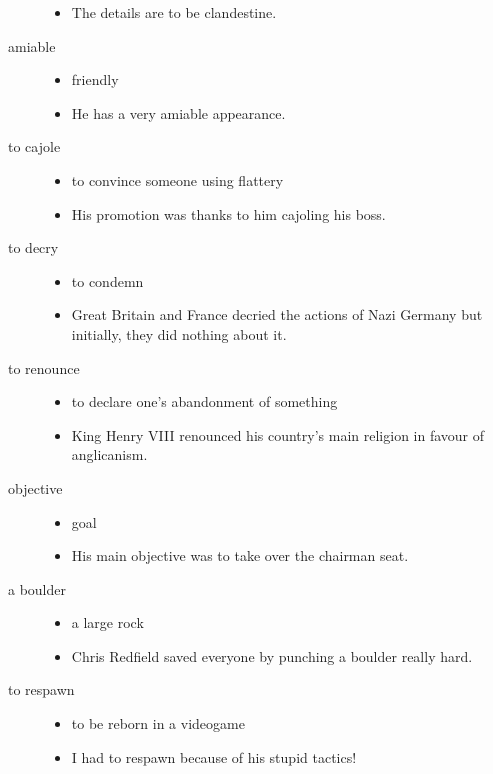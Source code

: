 \documentclass[a4paper]{article}
\begin{document}
\begin{description}
\begin{itemize}
        \item The details are to be clandestine.
    \end{itemize}
    \item[amiable] \begin{itemize}
        \item friendly
        \item He has a very amiable appearance.
    \end{itemize}
    \item[to cajole] \begin{itemize}
        \item to convince someone using flattery
        \item His promotion was thanks to him cajoling his boss.
    \end{itemize}
    \item[to decry] \begin{itemize}
        \item to condemn
        \item Great Britain and France decried the actions of Nazi Germany but initially, they did nothing about it.
    \end{itemize}
    \item[to renounce] \begin{itemize}
        \item to declare one's abandonment of something
        \item King Henry VIII renounced his country's main religion in favour of anglicanism.
    \end{itemize}
    \item[objective] \begin{itemize}
        \item goal
        \item His main objective was to take over the chairman seat.
    \end{itemize}
    \item[a boulder] \begin{itemize}
        \item a large rock
        \item Chris Redfield saved everyone by punching a boulder really hard.
    \end{itemize}
    \item[to respawn] \begin{itemize}
        \item to be reborn in a videogame
        \item I had to respawn because of his stupid tactics!

\end{itemize}
\end{description}
\end{document}
